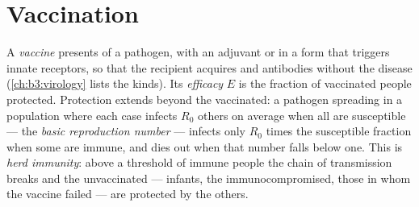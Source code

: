 \section{Vaccination}

\begin{definition}\label{def:b3:adaptive-immunity:vaccine}
A \emph{vaccine} presents  of a pathogen, with an adjuvant or
in a form that triggers innate receptors, so that the recipient
acquires  and antibodies without the disease
(\cref{ch:b3:virology} lists the kinds). Its \emph{efficacy} $E$ is the
fraction of vaccinated people protected. Protection extends beyond the
vaccinated: a pathogen spreading in a population where each case
infects $R_{0}$ others on average when all are susceptible --- the
\emph{basic reproduction number} --- infects only $R_{0}$ times the
susceptible fraction when some are immune, and dies out when that
number falls below one. This is \emph{herd immunity}: above a threshold
of immune people the chain of transmission breaks and the unvaccinated
--- infants, the immunocompromised, those in whom the vaccine failed
--- are protected by the others.
\end{definition}

